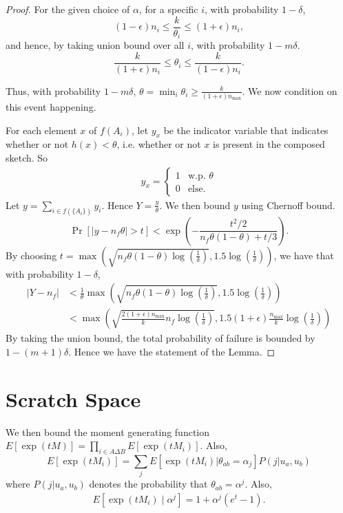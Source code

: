 \documentclass{sig-alternate}
\begin{document}
\begin{proof}
	For the given choice of $\alpha$, for a specific $i$, with probability $1 - \delta$, $$(1 - \epsilon)n_i \le \frac{k}{\theta_i} \le (1 + \epsilon)n_i, $$ and hence, by taking union bound over all $i$, with probability $1 - m\delta$.
	$$\frac{k}{(1 + \epsilon)n_i} \le \theta_i \le  \frac{k}{(1 - \epsilon)n_i}. $$
	
Thus, with probability $1 - m\delta$, $\theta = \min_i \theta_i \ge \frac{k}{(1 + \epsilon)n_{\max}}$. We now condition on this event happening. 

For each element $x$ of $ f({A_i})$, let $y_x$ be the indicator variable that indicates whether or not $h(x) < \theta$, i.e. whether or not $x$ is present in the composed sketch. So
\begin{align*}
	y_x = \begin{cases} 1 &\mbox{w.p. } \theta \\
	0 & \mbox{else.}  \end{cases}
\end{align*}
Let $ y = \sum_{i \in f(\{A_i\})} y_i$. Hence $ Y = \frac{y}{\theta}$. 
We then bound $y$ using Chernoff bound. 
$$ \Pr[ |y - n_f \theta| > t ] < \exp\left( - \frac{t^2/2}{n_f\theta(1-\theta) + t/3} \right). $$
By choosing $t = \max(\sqrt{n_f\theta(1 - \theta)\log(\frac{1}{\delta})}, 1.5\log(\frac{1}{\delta}))$, we have that with probability $1 - \delta$,
\begin{align*}
	 | Y - n_f| & < \frac{1}{\theta} \max(\sqrt{n_f\theta(1 - \theta)\log(\frac{1}{\delta})}, 1.5\log(\frac{1}{\delta}))\\
	& < \max(\sqrt{\frac{2(1 + \epsilon)n_{\max}}{k}n_f\log(\frac{1}{\delta})}, 1.5(1 + \epsilon)\frac{n_{\max}}{k}\log(\frac{1}{\delta}))
	\end{align*}
By taking the union bound, the total probability of failure is bounded by $1 - (m+1)\delta$. Hence we have the statement of the Lemma.

\end{proof}


\section{Scratch Space}
We then bound the moment generating function $E[\exp(tM)] = \prod_{i\in A\Delta B} E[\exp(t M_i)]$. Also, $$E[\exp(t M_i) ] = \sum_{j} E[\exp(t M_i) | \theta_{ab} = \alpha_j]P(j | u_a, u_b)$$ where $P(j | u_a, u_b)$ denotes the probability that $\theta_{ab} = \alpha^j$. Also,
\begin{align*}
	E[\exp(tM_i)\; |\; \alpha^j ] = 1 + \alpha^j(e^t - 1).
\end{align*}
\end{document}
